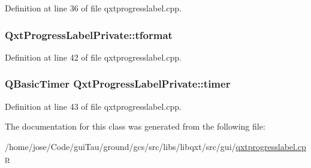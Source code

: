 Definition at line 36 of file qxtprogresslabel.\-cpp.

\hypertarget{class_qxt_progress_label_private_a45fe76030ddf8fa0a636ee0f0027dea9}{
\subsubsection[{tformat}]{ Qxt\-Progress\-Label\-Private\-::tformat}}\label{class_qxt_progress_label_private_a45fe76030ddf8fa0a636ee0f0027dea9}


Definition at line 42 of file qxtprogresslabel.\-cpp.

\hypertarget{class_qxt_progress_label_private_ac5d84d9a391a0475c703a86055e762ba}{
\subsubsection[{timer}]{\setlength{\rightskip}{0pt plus 5cm}Q\-Basic\-Timer Qxt\-Progress\-Label\-Private\-::timer}}\label{class_qxt_progress_label_private_ac5d84d9a391a0475c703a86055e762ba}


Definition at line 43 of file qxtprogresslabel.\-cpp.



The documentation for this class was generated from the following file\-:\begin{DoxyCompactItemize}
\item 
/home/jose/\-Code/gui\-Tau/ground/gcs/src/libs/libqxt/src/gui/\hyperlink{qxtprogresslabel_8cpp}{qxtprogresslabel.\-cpp}\end{DoxyCompactItemize}
